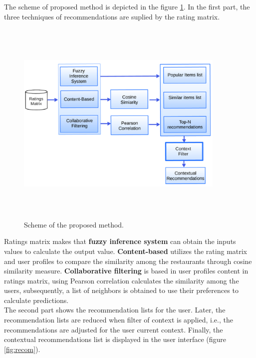 The scheme of proposed method is depicted in the figure
\ref{fig:archit}. In the first part, the three techniques of
recommendations are suplied by the rating matrix. 
\begin{figure}
\captionsetup{font=footnotesize}
\centering 
\includegraphics[width=10cm,height=10cm,keepaspectratio]{img/archit.png}
\caption{Scheme of the proposed method.}
\label{fig:archit}  
\end{figure}
Ratings matrix makes that \textbf{fuzzy inference system} can obtain
the inputs values to calculate the output value. \textbf{Content-based} 
utilizes the rating matrix and user profiles to compare the
similarity among the restaurants through cosine similarity measure.
\textbf{Collaborative filtering} is based in user profiles content in
ratings matrix, using Pearson correlation calculates the similarity
among the users, subsequently, a list of neighbors is obtained to use
their preferences to calculate predictions.\\
The second part shows the recommendation lists for the user. Later,
the recommendation lists are reduced when filter of context is applied,
i.e., the recommendations are adjusted for the user current context.
Finally, the contextual recommendations list is displayed in the user
interface (figure \ref{fig:recom}).






